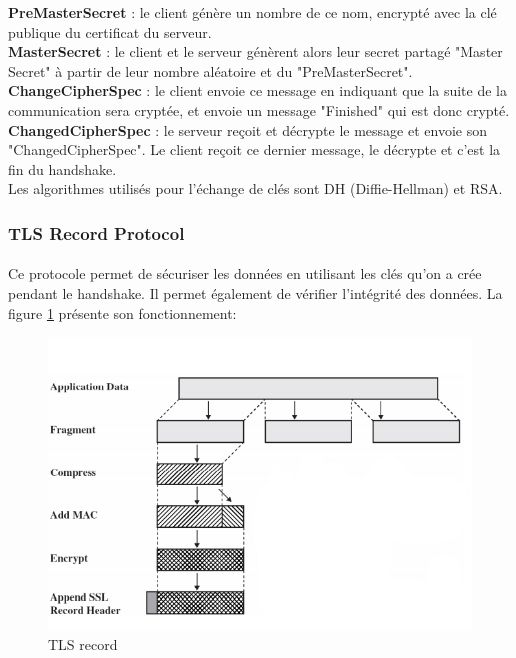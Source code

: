 \textbf{PreMasterSecret} : le client génère un nombre de ce nom, encrypté avec la clé publique du certificat du serveur.\\

\textbf{MasterSecret} : le client et le serveur génèrent alors leur secret partagé "Master Secret" à partir de leur nombre aléatoire et du "PreMasterSecret".\\

\textbf{ChangeCipherSpec} : le client envoie ce message en indiquant que la suite de la communication sera cryptée, et envoie un message "Finished" qui est donc crypté.\\

\textbf{ChangedCipherSpec} : le serveur reçoit et décrypte le message et envoie son "ChangedCipherSpec".  Le client reçoit ce dernier message, le décrypte et c'est la fin du handshake.\\

Les algorithmes utilisés pour l'échange de clés sont DH (Diffie-Hellman) et RSA. 

\subsubsection{TLS Record Protocol}

\paragraph{}
Ce protocole permet de sécuriser les données en utilisant les clés qu'on a crée pendant le handshake. Il permet également de vérifier l'intégrité des données. La figure \ref{record} présente son fonctionnement:
\begin{figure}[H]
\centering
\includegraphics[scale=0.7]{img/tls-record.png}
\caption{TLS record}
\label{record}
\end{figure}

